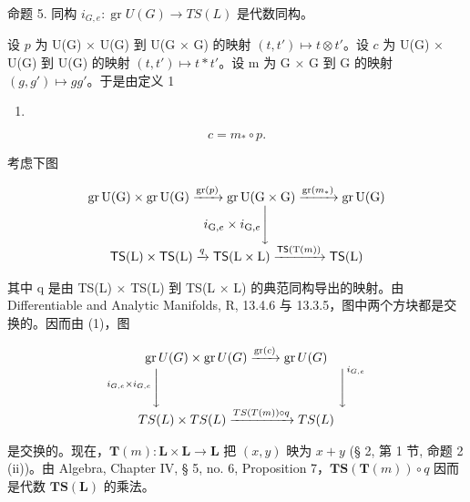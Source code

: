 命题 5. 同构 \(i_{G,e} \colon \operatorname{gr} U(G) \to TS(L)\) 是代数同构。

设 \(p\) 为 U(G) × U(G) 到 U(G × G) 的映射 \((t, t') \mapsto t \otimes t'\)。设 \(c\) 为 U(G) × U(G) 到 U(G) 的映射 \((t, t') \mapsto t * t'\)。设 m 为 G × G 到 G 的映射 \((g, g') \mapsto gg'\)。于是由定义 1

\begin{enumerate}
\def\labelenumi{(\arabic{enumi})}
\tightlist
\item
\end{enumerate}

\[
c = m _ {*} \circ p.
\]

考虑下图

\[
\begin{array}{c} \operatorname{gr} \mathrm{U(G)} \times \operatorname{gr} \mathrm{U(G)} \xrightarrow {\operatorname{gr} (p)} \operatorname{gr} \mathrm{U(G \times G)} \xrightarrow {\operatorname{gr} (m _ {*})} \operatorname{gr} \mathrm{U(G)} \\ i _ {\mathrm{G}, e} \times i _ {\mathrm{G}, e} \Biggl \downarrow \\ \mathsf {T S} (\mathrm{L}) \times \mathsf {T S} (\mathrm{L}) \xrightarrow {q} \mathsf {T S} (\mathrm{L} \times \mathrm{L}) \xrightarrow {\mathsf {T S} (\mathrm{T} (m))} \mathsf {T S} (\mathrm{L}) \end{array}
\]

其中 q 是由 TS(L) × TS(L) 到 TS(L × L) 的典范同构导出的映射。由 Differentiable and Analytic Manifolds, R, 13.4.6 与 13.3.5，图中两个方块都是交换的。因而由 (1)，图

\[
\begin{array}{c} \operatorname{gr} U (G) \times \operatorname{gr} U (G) \xrightarrow {\operatorname{gr} (c)} \operatorname{gr} U (G) \\ ^ {i _ {G, e} \times i _ {G, e}} \Biggl \downarrow \qquad \qquad \qquad \qquad \qquad \qquad \qquad \Biggl \downarrow^ {i _ {G, e}} \\ T S (L) \times T S (L) \xrightarrow {T S (T (m)) \circ q} T S (L) \end{array}
\]

是交换的。现在，\(\mathbf{T}(m): \mathbf{L} \times \mathbf{L} \to \mathbf{L}\) 把 \((x, y)\) 映为 \(x + y\) (§ 2, 第 1 节, 命题 2 (ii))。由 Algebra, Chapter IV, § 5, no. 6, Proposition 7，\(\mathbf{TS}(\mathbf{T}(m)) \circ q\) 因而是代数 \(\mathbf{TS}(\mathbf{L})\) 的乘法。

